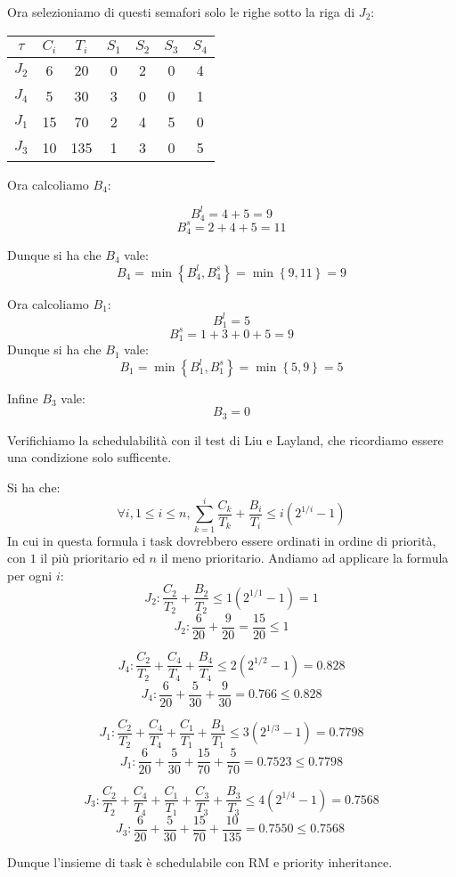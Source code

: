\begin{Esercizio1}
Ora selezioniamo di questi semafori solo le righe sotto la riga di \(J_{2}\):


\begin{table}[!h]
\centering
\begin{tabular}{|c|c|c|c|c|c|c|}
\hline
\(\tau\) & $C_i$ & $T_i$ & $S_1$ &  \cellcolor{blue!20} $S_2$ & $S_3$ & \cellcolor{blue!20} $S_4$ \\
\hline
$J_2$ & 6 & 20 & 0 & 2 & 0 & 4 \\

\arrayrulecolor{red}\hline
\arrayrulecolor{black}

$J_4$ & 5 & 30 & 3 & 0 & 0 & 1 \\
\hline
$J_1$ & 15 & 70 & 2 & 4 & 5 & 0 \\
\hline
$J_3$ & 10 & 135 & 1 & 3 & 0 & 5 \\
\hline
\end{tabular}
\label{tab:task_periodici}
\end{table}


Ora calcoliamo \(B_{4}\):

\[B_{4}^{l} = 4 + 5 = 9 \]
\[B_{4}^{s} = 2 +4 +5= 11 \]

Dunque si ha che \(B_{4}\) vale:
\[ B_{4} = \min \left\{B_{4}^{l} , B_{4}^{s}\right\} =
 \min \left\{9 , 11\right\} = 9 \]

 Ora calcoliamo \(B_{1}\):
\[B_{1}^{l} = 5\]
\[B_{1}^{s} = 1 + 3 + 0 +5 = 9 \]
Dunque si ha che \(B_{1}\) vale:
\[ B_{1} = \min \left\{B_{1}^{l} , B_{1}^{s}\right\} =
 \min \left\{5 , 9\right\} = 5 \]

Infine \(B_{3}\) vale:
\[B_{3} = 0\]

Verifichiamo la schedulabilità con il test di Liu e Layland, che ricordiamo essere una condizione
solo sufficente.

Si ha che:
\[ \forall i, 1 \le i \le n, \sum_{k=1}^{i} \frac{C_{k}}{T_{k}} 
+ \frac{B_{i}}{T_{i}} \leq  i (2^{1/i} - 1) \]
In cui in questa formula i task dovrebbero essere ordinati in ordine di priorità,
con \(1\) il più prioritario ed \( n \) il meno prioritario.
Andiamo ad applicare la formula per ogni \(i\):
\[ J_{2} : \frac{C_{2}}{T_{2}} + \frac{B_{2}}{T_{2}} \leq 1 (2^{1/1} - 1) = 1 \]
\[J_{2} : \frac{6}{20} + \frac{9}{20} = \frac{15}{20}\leq 1 \]


\[ J_{4} : \frac{C_{2}}{T_{2}} + \frac{C_{4}}{T_{4}} + \frac{B_{4}}{T_{4}} \leq 2 (2^{1/2} - 1) = 0.828 \]
\[ J_{4} : \frac{6}{20} + \frac{5}{30} + \frac{9}{30} = 0.766 \leq  0.828 \]

\[ J_{1} : \frac{C_{2}}{T_{2}} + \frac{C_{4}}{T_{4}} + 
\frac{C_{1}}{T_{1}} + \frac{B_{1}}{T_{1}} \leq 3 (2^{1/3} - 1) = 0.7798 \]
\[ J_{1} : \frac{6}{20} + \frac{5}{30} + \frac{15}{70} + \frac{5}{70} = 0.7523 \leq 0.7798 \]


\[J_{3} : \frac{C_{2}}{T_{2}} + \frac{C_{4}}{T_{4}} + 
\frac{C_{1}}{T_{1}} +
 \frac{C_{3}}{T_{3}} + \frac{B_{3}}{T_{3}} \leq 4 (2^{1/4} - 1) = 0.7568 \]
\[J_{3} : \frac{6}{20} + \frac{5}{30} + \frac{15}{70} + 
\frac{10}{135} = 0.7550 \leq 0.7568 \
 \]

 Dunque l'insieme di task è schedulabile con RM e priority inheritance.

\end{Esercizio1}


